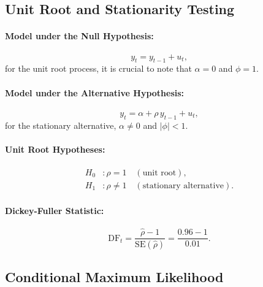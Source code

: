 \documentclass[a4paper,12pt]{article}
\begin{document}
\subsection{Unit Root and Stationarity Testing}

\paragraph{Model under the Null Hypothesis:}
\begin{equation}
    y_t = y_{t-1} + u_t,
    \label{eq:true}
\end{equation}
for the unit root process, it is crucial to note that \(\alpha = 0\) and \(\phi = 1\).

\paragraph{Model under the Alternative Hypothesis:}
\begin{equation}
    y_t = \alpha + \rho \, y_{t-1} + u_t,
    \label{eq:alternative}
\end{equation}
for the stationary alternative, \(\alpha \neq 0\) and \(\lvert \phi \rvert < 1\). 

\paragraph{Unit Root Hypotheses:}
\begin{equation}
\begin{aligned}
    H_0 &: \rho = 1 \quad (\text{unit root}),\\
    H_1 &: \rho \neq 1 \quad (\text{stationary alternative}).
\end{aligned}
\label{eq:dftest}
\end{equation}

\paragraph{Dickey-Fuller Statistic:}
\begin{equation}
    \text{DF}_t = \frac{\hat{\rho} - 1}{\text{SE}(\hat{\rho})}=\frac{0.96-1}{0.01}.
    \label{eq:dftstat2}
\end{equation}

\subsection{Conditional Maximum Likelihood}
\end{document}
